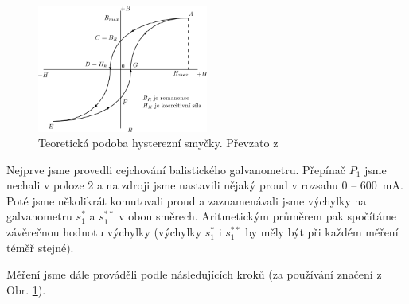 \documentclass[english]{article}
\begin{document}
		\begin{figure}[hbt]
		\centering
		\includegraphics[width=0.5\textwidth]{att/hysterezni_smycka.pdf}
		\caption{Teoretická podoba hysterezní smyčky. Převzato z \cite{bib:zadani}}
		\label{fig:hysterezni_smycka}
		\end{figure}
		
		Nejprve jsme provedli cejchování balistického galvanometru. Přepínač $P_1$ jsme nechali v poloze 2 a na zdroji jsme nastavili nějaký proud v rozsahu 0 -- 600~mA. Poté jsme několikrát komutovali proud a zaznamenávali jsme výchylky na galvanometru $s_1^*$ a $s_1^{**}$ v obou směrech. Aritmetickým průměrem pak spočítáme závěrečnou hodnotu výchylky (výchylky $s_1^*$ i $s_1^{**}$ by měly být při každém měření téměř stejné).
		
		Měření jsme dále prováděli podle následujících kroků (za používání značení z Obr. \ref{fig:hysterezni_smycka}). 
		
\end{document}
